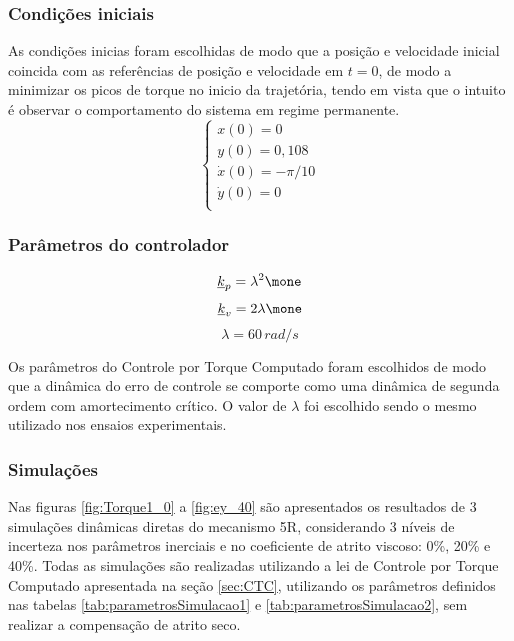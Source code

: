 \documentclass[]{politex}
\begin{document}
\subsubsection{Condições iniciais}
As condições inicias foram escolhidas de modo que a posição e velocidade inicial coincida com as referências de posição e velocidade em $t=0$, de modo a minimizar os picos de torque no inicio da trajetória, tendo em vista que o intuito é observar o comportamento do sistema em regime permanente. 
\begin{equation}
\begin{cases}
x(0) = 0\\
y(0) = 0{,}108 \\
\dot{x}(0) = -\pi/10 \\
\dot{y}(0) = 0 \\
\end{cases}
\end{equation}

\subsubsection{Parâmetros do controlador}
$$ \underline{k}_p = \lambda^2 \mone $$
$$ \underline{k}_v = 2\lambda \mone $$
$$ \lambda = 60 \, rad/s $$

Os parâmetros do Controle por Torque Computado foram escolhidos de modo que a dinâmica do erro de controle se comporte como uma dinâmica de segunda ordem com amortecimento crítico. O valor de $\lambda$ foi escolhido sendo o mesmo utilizado nos ensaios experimentais.

\subsubsection{Simulações}

Nas figuras \ref{fig:Torque1_0} a \ref{fig:ey_40} são apresentados os resultados de 3 simulações dinâmicas diretas do mecanismo 5R, considerando 3 níveis de incerteza nos parâmetros inerciais e no coeficiente de atrito viscoso: 0\%, 20\% e 40\%. Todas as simulações são realizadas utilizando a lei de Controle por Torque Computado apresentada na seção \ref{sec:CTC}, utilizando os parâmetros definidos nas tabelas \ref{tab:parametrosSimulacao1} e \ref{tab:parametrosSimulacao2}, sem realizar a compensação de atrito seco.

\newpage
\end{document}
